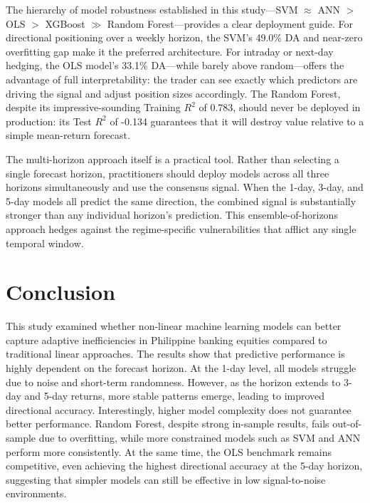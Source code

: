 \documentclass[12pt]{article}
\begin{document}
The hierarchy of model robustness established in this study---SVM $\approx$ ANN $>$ OLS $>$ XGBoost $\gg$ Random Forest---provides a clear deployment guide. For directional positioning over a weekly horizon, the SVM's 49.0\% DA and near-zero overfitting gap make it the preferred architecture. For intraday or next-day hedging, the OLS model's 33.1\% DA---while barely above random---offers the advantage of full interpretability: the trader can see exactly which predictors are driving the signal and adjust position sizes accordingly. The Random Forest, despite its impressive-sounding Training $R^2$ of 0.783, should never be deployed in production: its Test $R^2$ of -0.134 guarantees that it will destroy value relative to a simple mean-return forecast.

The multi-horizon approach itself is a practical tool. Rather than selecting a single forecast horizon, practitioners should deploy models across all three horizons simultaneously and use the consensus signal. When the 1-day, 3-day, and 5-day models all predict the same direction, the combined signal is substantially stronger than any individual horizon's prediction. This ensemble-of-horizons approach hedges against the regime-specific vulnerabilities that afflict any single temporal window.

\section{Conclusion}
\label{sec:conclusion}

This study examined whether non-linear machine learning models can better capture adaptive inefficiencies in Philippine banking equities compared to traditional linear approaches. The results show that predictive performance is highly dependent on the forecast horizon. At the 1-day level, all models struggle due to noise and short-term randomness. However, as the horizon extends to 3-day and 5-day returns, more stable patterns emerge, leading to improved directional accuracy. Interestingly, higher model complexity does not guarantee better performance. Random Forest, despite strong in-sample results, fails out-of-sample due to overfitting, while more constrained models such as SVM and ANN perform more consistently. At the same time, the OLS benchmark remains competitive, even achieving the highest directional accuracy at the 5-day horizon, suggesting that simpler models can still be effective in low signal-to-noise environments.
\end{document}
